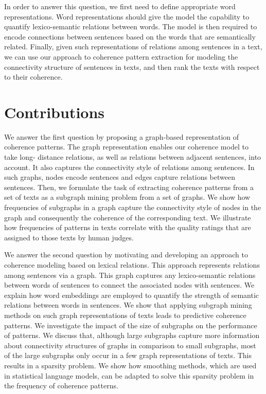 In order to answer this question, we first need to define appropriate word representations.  
Word representations should give the model the capability to quantify lexico-semantic relations between words. 
The model is then required to encode connections between sentences based on the words that are semantically related. 
Finally, given such representations of relations among sentences in a text, we can use our approach to coherence pattern extraction for modeling the connectivity structure of sentences in texts, and then rank the texts with respect to their coherence. 

\section{Contributions}
\label{sec:intro-contributions}

We answer the first question by proposing a graph-based representation of coherence patterns. 
The graph representation enables our coherence model to take long- distance relations, as well as relations between adjacent sentences,  into account. 
It also captures the connectivity style of relations among sentences. 
In such graphs, nodes encode sentences and edges capture relations between sentences. 
Then, we formulate the task of extracting coherence patterns from a set of texts as a subgraph mining problem from a set of graphs. 
We show how frequencies of subgraphs in a graph capture the connectivity style of nodes in the graph and consequently the coherence of the corresponding text. 
We illustrate how frequencies of patterns in texts correlate with the quality ratings that are assigned to those texts by human judges. 

We answer the second question by motivating and developing an approach to coherence modeling based on lexical relations. 
This approach represents relations among sentences via a graph. 
This graph captures any lexico-semantic relations between words of sentences to connect the associated nodes with sentences. 
We explain how word embeddings are employed to quantify the strength of semantic relations between words in sentences. 
We show that applying subgraph mining methods on such graph representations of texts leads to  predictive coherence patterns. 
We investigate the impact of the size of subgraphs on the performance of patterns. 
We discuss that, although large subgraphs capture more information about connectivity structures of graphs in comparison to small subgraphs, most of the large subgraphs only occur in a few graph representations of texts.  
This results in a sparsity problem. 
We show how smoothing methods, which are used in statistical language models, can be adapted to solve this sparsity problem in the frequency of coherence patterns. 

